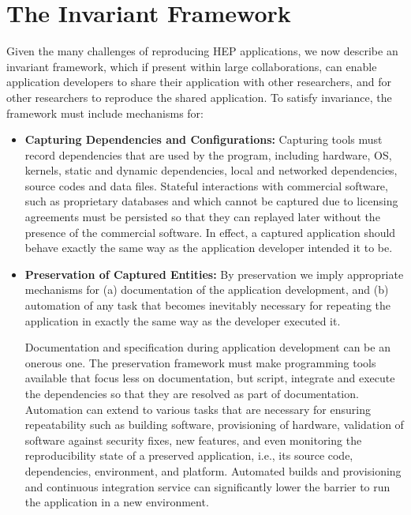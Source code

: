 \section{The Invariant Framework}

Given the many challenges of reproducing HEP applications, we now describe an invariant framework, which if present within large collaborations, can enable application developers to share their 
application with other researchers, and for other researchers to reproduce the shared application. 
To satisfy invariance, the framework must include mechanisms for:

\begin{itemize}

\item {\bf Capturing Dependencies and Configurations:} Capturing tools must record dependencies that are used by the program, including hardware, OS, kernels, static and dynamic dependencies, local and networked dependencies, source codes and data files. Stateful interactions with commercial software, such as proprietary databases and which cannot be captured due to licensing agreements must be persisted so that they can replayed later without the presence of the commercial software.  In effect, a captured application should behave exactly the same way as the application developer intended it to be. 

\item{\bf Preservation of Captured Entities:} By preservation we imply appropriate mechanisms for (a) documentation of the application development, and (b) automation of any task that becomes inevitably 
necessary for repeating the application in exactly the same way as the developer executed it. 
 
Documentation and specification during application development can be an onerous one. The preservation framework must make programming tools available that 
focus less on documentation, but script, integrate and execute the dependencies so that they are resolved as part of documentation. 
Automation can extend to various tasks that are necessary for ensuring repeatability such as building software, provisioning of hardware, 
validation of software against security fixes, new features, and even monitoring the reproducibility state of a preserved application, i.e., its source code, dependencies, environment, and platform.
Automated builds and provisioning and continuous integration service can significantly lower the barrier to run the application in a new environment. 


\end{itemize}
